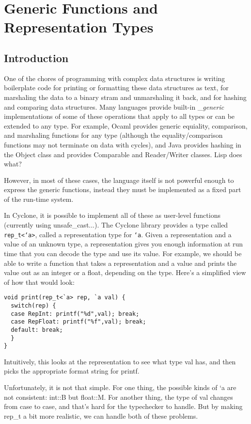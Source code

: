 \section{Generic Functions and Representation Types}

\subsection{Introduction}

One of the chores of programming with complex data structures is writing boilerplate code for printing or formatting these data structures as text, for marshaling the data to a binary stram and unmarshaling it back, and for hashing and comparing data structures.  Many languages provide built-in _\emph{generic} implementations of some of these operations that apply to all types or can be extended to any type.  For example, Ocaml provides generic equiality, comparison, and marshaling functions for any type (although the equality/comparison functions may not terminate on data with cycles), and Java provides hashing in the Object class and provides Comparable and Reader/Writer classes.  Lisp does what?

However, in most of these cases, the language itself is not powerful enough to express the generic functions, instead they must be implemented as a fixed part of the run-time system.

In Cyclone, it is possible to implement all of these as user-level functions (currently using unsafe_cast...).  The Cyclone library provides a type called \texttt{rep_t<`a>}, called a representation type for \texttt{`a}.  Given a representation and a value of an unknown type, a representation gives you enough information at run time that you can decode the type and use its value.  For example, we should be able to write a function that takes a representation and a value and prints the value out as an integer or a float, depending on the type.  Here's a simplified view of how that would look:

\begin{verbatim}
void print(rep_t<`a> rep, `a val) {
  switch(rep) {
  case RepInt: printf("%d",val); break;
  case RepFloat: printf("%f",val); break;
  default: break;
  }
}
\end{verbatim}

Intuitively, this looks at the representation to see what type val has, and then picks the appropriate format string for printf.

Unfortunately, it is not that simple.  For one thing, the possible kinds of `a are not consistent: int::B but float::M.  For another thing, the type of val changes from case to case, and that's hard for the typechecker to handle.  But by making rep_t a bit more realistic, we can handle both of these problems.

